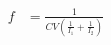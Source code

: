 \documentclass[12pt]{article}
\begin{document}
\begin{align*}
f &= \frac{1}{CV \left( \frac{1}{I_1} + \frac{1}{I_2} \right)}
\end{align*}
\end{document}
